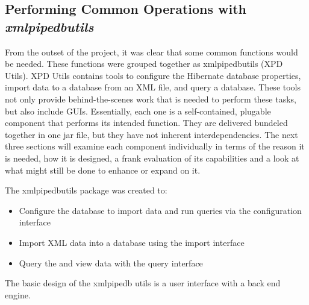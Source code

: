 \subsection{Performing Common Operations with \emph{xmlpipedbutils}}
From the outset of the project, it was clear that some common functions would be needed. These functions were grouped together as xmlpipedbutils (XPD Utils). XPD Utils contains tools to configure the Hibernate database properties, import data to a database from an XML file, and query a database. These tools not only provide behind-the-scenes work that is needed to perform these tasks, but also include GUIs. Essentially, each one is a self-contained, plugable component that performs its intended function. They are delivered bundeled together in one jar file, but they have not inherent interdependencies. The next three sections will examine each component individually in terms of the reason it is needed, how it is designed, a frank evaluation of its capabilities and a look at what might still be done to enhance or expand on it.

The xmlpipedbutils package was created to:
\begin{itemize}
	\item {Configure the database to import data and run queries via the configuration interface}
	\item {Import XML data into a database using the import interface}
	\item {Query the and view data with the query interface}
\end{itemize}
\par
	The basic design of the xmlpipedb utils is a user interface with a back end engine. 
